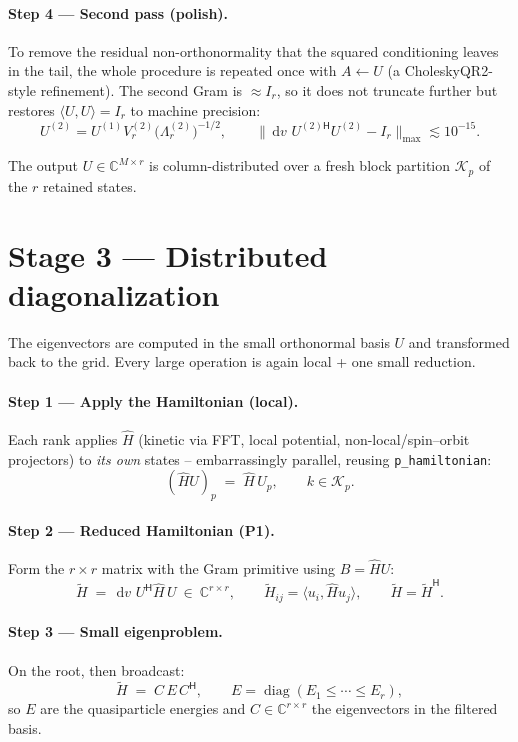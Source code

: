\documentclass[11pt]{article}
\newcommand{\dv}{\,\mathrm{d}v\,}
\newcommand{\Herm}{^{\mathsf{H}}}
\begin{document}
\paragraph{Step 4 --- Second pass (polish).} To remove the residual
non-orthonormality that the squared conditioning leaves in the tail, the whole
procedure is repeated once with $A\leftarrow U$ (a CholeskyQR2-style refinement).
The second Gram is $\approx I_r$, so it does not truncate further but restores
$\langle U,U\rangle=I_r$ to machine precision:
\[
  \boxed{\;U^{(2)} = U^{(1)} V_r^{(2)} \big(\Lambda_r^{(2)}\big)^{-1/2},\qquad
  \big\| \dv\,U^{(2)\mathsf H} U^{(2)} - I_r\big\|_{\max}\lesssim 10^{-15}. \;}
\]

\medskip
The output $U\in\mathbb{C}^{M\times r}$ is column-distributed over a fresh block
partition $\mathcal K_p$ of the $r$ retained states.

\section{Stage 3 --- Distributed diagonalization}

The eigenvectors are computed in the small orthonormal basis $U$ and transformed
back to the grid. Every large operation is again local + one small reduction.

\paragraph{Step 1 --- Apply the Hamiltonian (local).} Each rank applies $\hat H$
(kinetic via FFT, local potential, non-local/spin--orbit projectors) to \emph{its
own} states -- embarrassingly parallel, reusing \texttt{p\_hamiltonian}:
\[
  (\hat H U)_p \;=\; \hat H\,U_p,\qquad k\in\mathcal K_p .
\]

\paragraph{Step 2 --- Reduced Hamiltonian (P1).} Form the $r\!\times\!r$ matrix
with the Gram primitive using $B=\hat H U$:
\begin{equation}
  \widetilde H \;=\; \dv\,U\Herm \hat H\,U \ \in\ \mathbb{C}^{r\times r},
  \qquad \widetilde H_{ij}=\langle u_i,\hat H u_j\rangle,\qquad
  \widetilde H = \widetilde H\Herm .
  \label{eq:Hred}
\end{equation}

\paragraph{Step 3 --- Small eigenproblem.} On the root, then broadcast:
\begin{equation}
  \widetilde H \;=\; C\,E\,C\Herm,\qquad
  E=\operatorname{diag}(E_1\le\cdots\le E_r),
  \label{eq:smalleig}
\end{equation}
so $E$ are the quasiparticle energies and $C\in\mathbb{C}^{r\times r}$ the
eigenvectors in the filtered basis.
\end{document}
